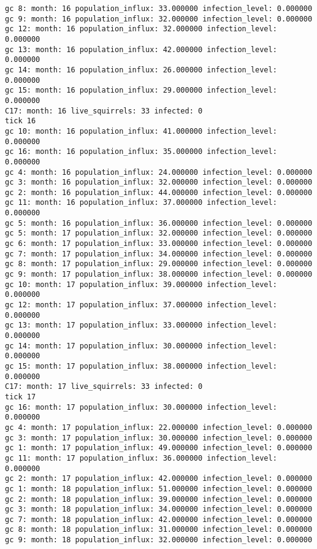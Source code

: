 \begin{lstlisting}[basicstyle=\small]
gc 8: month: 16 population_influx: 33.000000 infection_level: 0.000000
gc 9: month: 16 population_influx: 32.000000 infection_level: 0.000000
gc 12: month: 16 population_influx: 32.000000 infection_level: 0.000000
gc 13: month: 16 population_influx: 42.000000 infection_level: 0.000000
gc 14: month: 16 population_influx: 26.000000 infection_level: 0.000000
gc 15: month: 16 population_influx: 29.000000 infection_level: 0.000000
C17: month: 16 live_squirrels: 33 infected: 0
tick 16
gc 10: month: 16 population_influx: 41.000000 infection_level: 0.000000
gc 16: month: 16 population_influx: 35.000000 infection_level: 0.000000
gc 4: month: 16 population_influx: 24.000000 infection_level: 0.000000
gc 3: month: 16 population_influx: 32.000000 infection_level: 0.000000
gc 2: month: 16 population_influx: 44.000000 infection_level: 0.000000
gc 11: month: 16 population_influx: 37.000000 infection_level: 0.000000
gc 5: month: 16 population_influx: 36.000000 infection_level: 0.000000
gc 5: month: 17 population_influx: 32.000000 infection_level: 0.000000
gc 6: month: 17 population_influx: 33.000000 infection_level: 0.000000
gc 7: month: 17 population_influx: 34.000000 infection_level: 0.000000
gc 8: month: 17 population_influx: 29.000000 infection_level: 0.000000
gc 9: month: 17 population_influx: 38.000000 infection_level: 0.000000
gc 10: month: 17 population_influx: 39.000000 infection_level: 0.000000
gc 12: month: 17 population_influx: 37.000000 infection_level: 0.000000
gc 13: month: 17 population_influx: 33.000000 infection_level: 0.000000
gc 14: month: 17 population_influx: 30.000000 infection_level: 0.000000
gc 15: month: 17 population_influx: 38.000000 infection_level: 0.000000
C17: month: 17 live_squirrels: 33 infected: 0
tick 17
gc 16: month: 17 population_influx: 30.000000 infection_level: 0.000000
gc 4: month: 17 population_influx: 22.000000 infection_level: 0.000000
gc 3: month: 17 population_influx: 30.000000 infection_level: 0.000000
gc 1: month: 17 population_influx: 49.000000 infection_level: 0.000000
gc 11: month: 17 population_influx: 36.000000 infection_level: 0.000000
gc 2: month: 17 population_influx: 42.000000 infection_level: 0.000000
gc 1: month: 18 population_influx: 51.000000 infection_level: 0.000000
gc 2: month: 18 population_influx: 39.000000 infection_level: 0.000000
gc 3: month: 18 population_influx: 34.000000 infection_level: 0.000000
gc 7: month: 18 population_influx: 42.000000 infection_level: 0.000000
gc 8: month: 18 population_influx: 31.000000 infection_level: 0.000000
gc 9: month: 18 population_influx: 32.000000 infection_level: 0.000000

\end{lstlisting}
